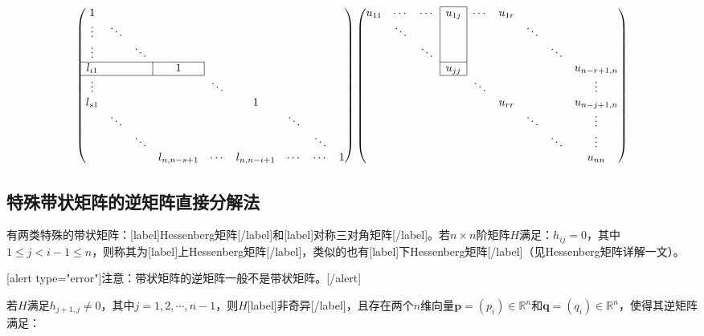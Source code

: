 \documentclass[UTF8,nofonts]{ctexart}
\begin{document}
\[
\begin{pmatrix}
1 & & & & & & & & \\
\vdots & \ddots & & & & & & & \\
\vdots & & \ddots & & & & & & \\
\cline{1-4}
l_{i1} & & & \multicolumn{1}{|c|}{1} & & & & & \\
\cline{1-4}
\vdots & & & & \ddots & & & & \\
l_{s1} & & & & & 1 & & & \\
& \ddots & & & & & \ddots & \\
& & \ddots & & & & & \ddots & \\
& & & l_{n,n-s+1} & \cdots & l_{n,n-i+1} & \cdots & \cdots & 1 \\
\end{pmatrix}
\begin{pmatrix}
\cline{4-4}
u_{11} & \cdots & \cdots & \multicolumn{1}{|c|}{u_{1j}} & \cdots & u_{1r} & & & \\
& \ddots & & \multicolumn{1}{|c|}{} & & & \ddots & & \\
& & \ddots & \multicolumn{1}{|c|}{} & & & & \ddots &\\
\cline{4-4}
& & & \multicolumn{1}{|c|}{u_{jj}} & & & & & u_{n-r+1,n} \\
\cline{4-4}
& & & & \ddots & & & & \vdots \\
& & & & & u_{rr} & & & u_{n-j+1,n}\\
& & & & & & \ddots & & \vdots \\
& & & & & & & \ddots & \vdots \\
& & &  & & & & & u_{nn} \\
\end{pmatrix}
\]

\subsection*{特殊带状矩阵的逆矩阵直接分解法}

有两类特殊的带状矩阵：[label]Hessenberg矩阵[/label]和[label]对称三对角矩阵[/label]。若$n \times n$阶矩阵$H$满足：$h_{ij}=0$，其中$1 \leq j<i-1 \leq n$，则称其为[label]上Hessenberg矩阵[/label]，类似的也有[label]下Hessenberg矩阵[/label]（见Hessenberg矩阵详解一文）。

[alert type="error"]注意：带状矩阵的逆矩阵一般不是带状矩阵。[/alert]

若$H$满足$h_{j+1,j} \neq 0$，其中$j=1,2,\cdots,n-1$，则$H$[label]非奇异[/label]，且存在两个$n$维向量$\boldsymbol{p}=(p_i)\in\mathbb{R}^{n}$和$\boldsymbol{q}=(q_i)\in\mathbb{R}^{n}$，使得其逆矩阵满足：
\end{document}
